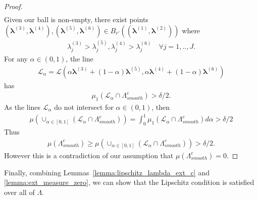 \documentclass[10pt]{book}
\theoremstyle{definition}
\begin{document}
\begin{proof}
\begin{align}
	\end{align}
	Given our ball is non-empty, there exist points $\left(\boldsymbol{\lambda}^{(3)},\boldsymbol{\lambda}^{(4)}\right),\left(\boldsymbol{\lambda}^{(5)},\boldsymbol{\lambda}^{(6)}\right)\in B_{r'}\left(\left(\boldsymbol{\lambda}^{(1)},\boldsymbol{\lambda}^{(2)}\right)\right)$
	where 
	\begin{align}
	{\lambda}_{j}^{(3)} > {\lambda}_{j}^{(5)},
	{\lambda}_{j}^{(4)} > {\lambda}_{j}^{(6)}
	\quad \forall j=1,..,J.
	\end{align}
	For any $\alpha \in (0,1)$, the line
	\begin{align}
	\mathcal{L}_\alpha =
	\mathcal{L}\left(\alpha\boldsymbol{\lambda}^{(3)}+(1-\alpha)\boldsymbol{\lambda}^{(5)},\alpha\boldsymbol{\lambda}^{(4)}+(1-\alpha)\boldsymbol{\lambda}^{(6)}\right)
	\end{align}
	has
	\begin{align}
	\mu_1\left(
	\mathcal{L}_\alpha
	\cap
	\Lambda_{smooth}^{c}
	\right)
	> \delta/2.
	\end{align}
	As the lines $\mathcal{L}_\alpha$ do not intersect for $\alpha \in (0,1)$, then
	\begin{align}
	\mu\left(
	\cup_{\alpha\in[0,1]}
	\left(
	\mathcal{L}_\alpha
	\cap\Lambda_{smooth}^{c}
	\right)\right)
	= \int_{0}^{1} \mu_1\left(
	\mathcal{L}_\alpha
	\cap
	\Lambda_{smooth}^{c}
	\right) d\alpha
	> \delta/2
	\end{align}
	Thus
	\begin{align}
	\mu\left(\Lambda_{smooth}^{c}\right)
	\ge
	\mu\left(
	\cup_{\alpha\in[0,1]}
	\left(
	\mathcal{L}_\alpha
	\cap\Lambda_{smooth}^{c}
	\right)\right)
	>\delta/2.
	\end{align}
	However this is a contradiction of our assumption that $\mu\left(\Lambda_{smooth}^{c}\right)=0$.
\end{proof}

Finally, combining Lemmas~\ref{lemma:lipschitz_lambda_ext_c} and \ref{lemma:ext_measure_zero}, we can show that the Lipschitz condition is satisfied over all of $\Lambda$.
\end{document}
